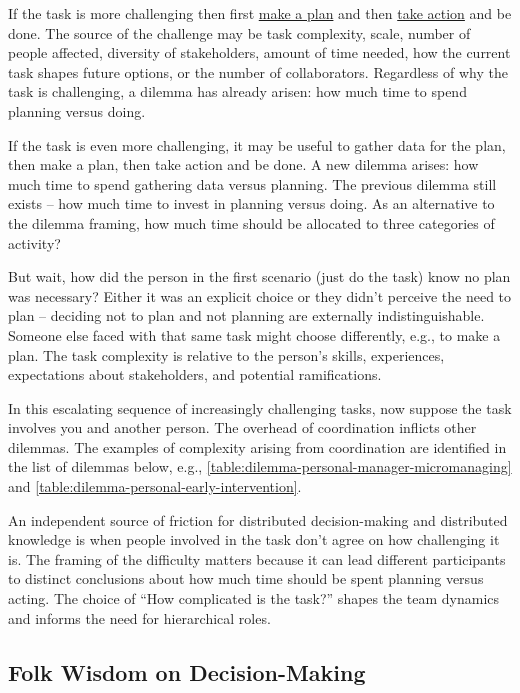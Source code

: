 If the task is more challenging then first \underline{make a plan} and then \underline{take action} and be done. 
The source of the challenge may be task complexity, scale, number of people affected, diversity of stakeholders, amount of time needed, how the current task shapes future options, or the number of collaborators. Regardless of why the task is challenging, a dilemma has already arisen: how much time to spend planning versus doing. 

If the task is even more challenging, it may be useful to gather data for the plan, then make a plan, then take action and be done. A new dilemma arises: how much time to spend gathering data versus planning. The previous dilemma still exists -- how much time to invest in planning versus doing. 
As an alternative to the dilemma framing, how much time should be allocated to three categories of activity?

But wait, how did the person in the first scenario (just do the task) know no plan was necessary? Either it was an explicit choice or they didn't perceive the need to plan -- deciding not to plan and not planning are externally indistinguishable. Someone else faced with that same task might choose differently, e.g., to make a plan. The task complexity is relative to the person's skills, experiences, expectations about stakeholders, and potential ramifications.

In this escalating sequence of increasingly challenging tasks, now suppose the task involves you and another person. The overhead of coordination inflicts other dilemmas. The examples of complexity arising from coordination are identified in the list of dilemmas below, e.g., \ref{table:dilemma-personal-manager-micromanaging} and \ref{table:dilemma-personal-early-intervention}.

An independent source of friction for distributed decision-making and distributed knowledge is when people involved in the task don't agree on how challenging it is. The framing of the difficulty matters because it can lead different participants to distinct conclusions about how much time should be spent planning versus acting. The choice of ``How complicated is the task?'' shapes the team dynamics and informs the need for hierarchical roles. 

\subsection*{Folk Wisdom on Decision-Making}

